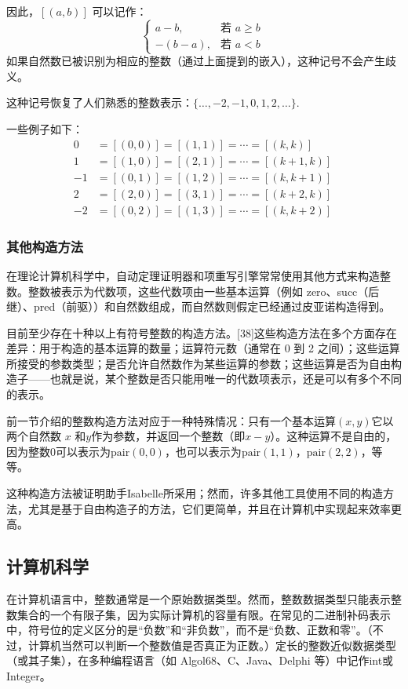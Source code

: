 因此，$[(a,b)]$ 可以记作：
$$
\begin{cases}
a-b, & \text{若 } a \geq b \\[6pt]
-(b-a), & \text{若 } a < b
\end{cases}~
$$
如果自然数已被识别为相应的整数（通过上面提到的嵌入），这种记号不会产生歧义。

这种记号恢复了人们熟悉的整数表示：$\{ \ldots, -2, -1, 0, 1, 2, \ldots \}$.

一些例子如下：
$$
\begin{aligned}
0 &= [(0,0)] = [(1,1)] = \cdots = [(k,k)] \\[6pt]
1 &= [(1,0)] = [(2,1)] = \cdots = [(k+1,k)] \\[6pt]
-1 &= [(0,1)] = [(1,2)] = \cdots = [(k,k+1)] \\[6pt]
2 &= [(2,0)] = [(3,1)] = \cdots = [(k+2,k)] \\[6pt]
-2 &= [(0,2)] = [(1,3)] = \cdots = [(k,k+2)]
\end{aligned}~
$$
\subsubsection{其他构造方法}
在理论计算机科学中，自动定理证明器和项重写引擎常常使用其他方式来构造整数。整数被表示为代数项，这些代数项由一些基本运算（例如 zero、succ（后继）、pred（前驱））和自然数组成，而自然数则假定已经通过皮亚诺构造得到。

目前至少存在十种以上有符号整数的构造方法。[38]这些构造方法在多个方面存在差异：用于构造的基本运算的数量；运算符元数（通常在 0 到 2 之间）；这些运算所接受的参数类型；是否允许自然数作为某些运算的参数；这些运算是否为自由构造子——也就是说，某个整数是否只能用唯一的代数项表示，还是可以有多个不同的表示。

前一节介绍的整数构造方法对应于一种特殊情况：只有一个基本运算$(x,y)$它以两个自然数 $x$ 和$y$作为参数，并返回一个整数（即$x-y$）。这种运算不是自由的，因为整数$0$可以表示为$\text{pair}(0,0)$，也可以表示为$\text{pair}(1,1)$，$\text{pair}(2,2)$，等等。

这种构造方法被证明助手Isabelle所采用；然而，许多其他工具使用不同的构造方法，尤其是基于自由构造子的方法，它们更简单，并且在计算机中实现起来效率更高。
\subsection{计算机科学}
在计算机语言中，整数通常是一个原始数据类型。然而，整数数据类型只能表示整数集合的一个有限子集，因为实际计算机的容量有限。在常见的二进制补码表示中，符号位的定义区分的是“负数”和“非负数”，而不是“负数、正数和零”。（不过，计算机当然可以判断一个整数值是否真正为正数。）定长的整数近似数据类型（或其子集），在多种编程语言（如 Algol68、C、Java、Delphi 等）中记作int或Integer。

